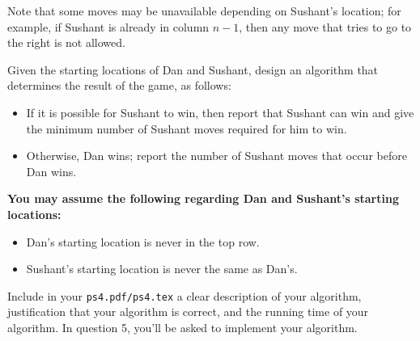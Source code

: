 \documentclass{assignment-263}
\begin{document}
\begin{enumerate}
		Note that some moves may be unavailable depending on Sushant's
		location; for example, if Sushant is already in column $n-1$, then any
		move that tries to go to the right is not allowed.

		Given the starting locations of Dan and Sushant, design an algorithm
		that determines the result of the game, as follows:
		\begin{itemize}
			\item If it is possible for Sushant to win, then report that Sushant
				can win and give the minimum number of Sushant moves required
				for him to win.
			\item Otherwise, Dan wins; report the number of Sushant moves that
				occur before Dan wins.
		\end{itemize}

		\textbf{You may assume the following regarding Dan and Sushant's
		starting locations:}
		\begin{itemize}
			\item Dan's starting location is never in the top row.
			\item Sushant's starting location is never the same as Dan's.
		\end{itemize}

		Include in your \verb|ps4.pdf/ps4.tex| a clear description of your
		algorithm, justification that your algorithm is correct, and the
		running time of your algorithm.
		In question 5, you'll be asked to implement your algorithm.

\end{enumerate}
\end{document}
